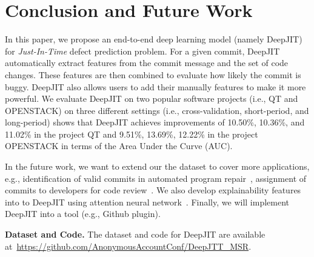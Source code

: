 \section{Conclusion and Future Work}
\label{sec:conclusion}
In this paper, we propose an end-to-end deep learning model (namely DeepJIT) for \emph{Just-In-Time} defect prediction problem. For a given commit, DeepJIT automatically extract features from the commit message and the set of code changes. These features are then combined to evaluate how likely the commit is buggy. DeepJIT also allows users to add their manually features to make it more powerful. We evaluate DeepJIT on two popular software projects (i.e., QT and OPENSTACK) on three different settings (i.e., cross-validation, short-period, and long-period) shows that DeepJIT achieves improvements of 10.50\%, 10.36\%, and 11.02\% in the project QT and 9.51\%, 13.69\%, 12.22\% in the project OPENSTACK in terms  of the Area Under the Curve (AUC).

In the future work, we want to extend our the dataset to cover more applications, e.g., identification of valid commits in automated program repair~\cite{xiong2018identifying}, assignment of commits to developers for code review~\cite{thongtanunam2015should, zanjani2016automatically}. We also develop explainability features into to DeepJIT using attention neural network~\cite{yin2016abcnn}. Finally, we will implement DeepJIT into a tool (e.g., Github plugin).

\noindent \textbf{Dataset and Code.} The dataset and code for DeepJIT are available at~\url{https://github.com/AnonymousAccountConf/DeepJTT_MSR}.